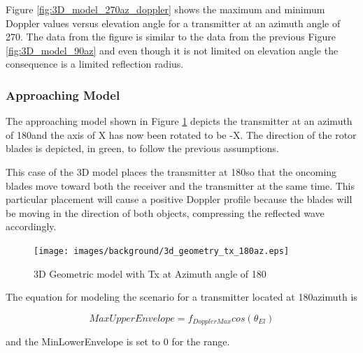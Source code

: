 Figure \ref{fig:3D_model_270az_doppler} shows the maximum and minimum Doppler values versus elevation angle for a transmitter at an azimuth angle of 270\textdegree. The data from the figure is similar to the data from the previous Figure \ref{fig:3D_model_90az} and even though it is not limited on elevation angle the consequence is a limited reflection radius.


\subsubsection{Approaching Model}
The approaching model shown in Figure \ref{fig:3D_model_180az} depicts the transmitter at an azimuth of 180\textdegree \space and the axis of X has now been rotated to be -X. The direction of the rotor blades is depicted, in green, to follow the previous assumptions.

This case of the 3D model places the transmitter at 180\textdegree \space so that the oncoming blades move toward both the receiver and the transmitter at the same time. This particular placement will cause a positive Doppler profile because the blades will be moving in the direction of both objects, compressing the reflected wave accordingly.

\begin{figure}
	\begin{center}
		\texttt{[image: images/background/3d\_geometry\_tx\_180az.eps]}
		\caption{3D Geometric model with Tx at Azimuth angle of 180\textdegree}
		\label{fig:3D_model_180az}
	\end{center}
\end{figure}

The equation for modeling the scenario for a transmitter located at 180\textdegree \space azimuth is

\begin{equation}
	MaxUpperEnvelope = f_{DopplerMax}cos(\theta_{El})
	\label{eq:theory_180_upper}
\end{equation}

and the MinLowerEnvelope is set to 0 for the range.

